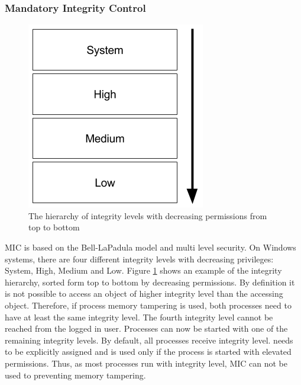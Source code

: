 \subsubsection{Mandatory Integrity Control}
\begin{figure}[!htbp]
\centering
\includegraphics[scale=0.5]{sections/background/defenses/mic.png}
\caption{The hierarchy of integrity levels with decreasing permissions from top to bottom}
\label{fig:mic}
\end{figure}
\gls{MIC} is based on the Bell-LaPadula \cite{eckert2014sicherheit} model and multi level security. On Windows systems, there are four different integrity levels with decreasing privileges: System, High, Medium and Low. Figure \ref{fig:mic} shows an example of the integrity hierarchy, sorted form top to bottom by decreasing permissions. By definition it is not possible to access an object of higher integrity level than the accessing object. Therefore, if process memory tampering is used, both processes need to have at least the same integrity level. The fourth integrity level  cannot be reached from the logged in user. Processes can now be started with one of the remaining integrity levels. By default, all processes receive  integrity level.  needs to be explicitly assigned and  is used only if the process is started with elevated permissions. Thus, as most processes run with  integrity level, \gls{MIC} can not be used to preventing memory tampering.